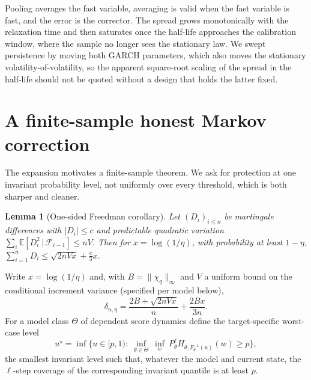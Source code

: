 \documentclass[11pt]{article}
\newtheorem{lemma}[theorem]{Lemma}
\theoremstyle{definition}
\theoremstyle{remark}
\newcommand{\E}{\mathbb{E}}
\newcommand{\given}{\,|\,}
\newcommand{\Fcal}{\mathcal{F}}
\begin{document}
Pooling averages the fast variable, averaging is valid when
the fast variable is fast, and the error is the corrector. The spread grows monotonically with the
relaxation time and then saturates once the half-life approaches the calibration window, where the
sample no longer sees the stationary law. We swept persistence by moving both GARCH parameters,
which also moves the stationary volatility-of-volatility, so the apparent square-root scaling of the
spread in the half-life should not be quoted without a design that holds the latter fixed.

\section{A finite-sample honest Markov correction}\label{sec:honest}

The expansion motivates a finite-sample theorem. We ask for protection at one invariant
probability level, not uniformly over every threshold, which is both sharper and cleaner.

\begin{lemma}[One-sided Freedman corollary]\label{lem:freedman}
Let $(D_i)_{i\le n}$ be martingale differences with $|D_i|\le c$ and predictable quadratic
variation $\sum_i\E[D_i^2\given\Fcal_{i-1}]\le nV$. Then for $x=\log(1/\eta)$, with
probability at least $1-\eta$, $\sum_{i=1}^n D_i \le \sqrt{2nVx}+\tfrac{c}{3}x$.
\end{lemma}

Write $x=\log(1/\eta)$ and, with $B=\|\chi_{q}\|_\infty$ and $V$ a uniform bound on the
conditional increment variance (specified per model below),
\begin{equation}\label{eq:delta}
  \delta_{n,\eta} = \frac{2B + \sqrt{2nVx}}{n} + \frac{2Bx}{3n} .
\end{equation}
For a model class $\Theta$ of dependent score dynamics define the target-specific worst-case
level
\begin{equation}\label{eq:uwc}
  u^\star = \inf\Big\{ u\in[p,1) :\;
    \inf_{\theta\in\Theta}\ \inf_{w}\ P_\theta^{\ell}H_{\theta,F_\theta^{-1}(u)}(w) \ge p \Big\},
\end{equation}
the smallest invariant level such that, whatever the model and current state, the $\ell$-step
coverage of the corresponding invariant quantile is at least $p$.
\end{document}
